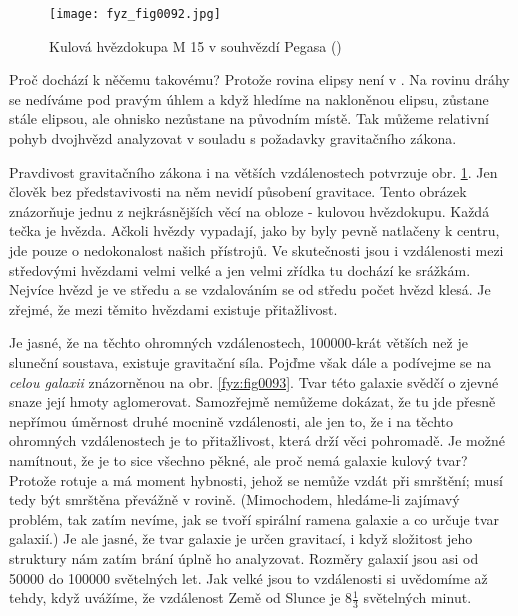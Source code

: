     \begin{figure}[ht!]  %
      \centering
      \texttt{[image: fyz\_fig0092.jpg]}
      \caption{Kulová hvězdokupa M 15 v souhvězdí Pegasa (\cite[s.~100]{Feynman01})}
      \label{fyz:fig0092}
    \end{figure}
    
    Proč dochází k něčemu takovému? Protože rovina elipsy není v . Na rovinu 
    dráhy se nedíváme pod pravým úhlem a když hledíme na nakloněnou elipsu, zůstane stále elipsou, 
    ale ohnisko nezůstane na původním místě. Tak můžeme relativní pohyb dvojhvězd analyzovat v 
    souladu s požadavky gravitačního zákona. 
    
    Pravdivost gravitačního zákona i na větších vzdálenostech potvrzuje obr. \ref{fyz:fig0092}. Jen 
    člověk bez představivosti na něm nevidí působení gravitace. Tento obrázek znázorňuje jednu z 
    nejkrásnějších věcí na obloze - kulovou hvězdokupu. Každá tečka je hvězda. Ačkoli hvězdy 
    vypadají, jako by byly pevně natlačeny k centru, jde pouze o nedokonalost našich přístrojů. Ve 
    skutečnosti jsou i vzdálenosti mezi středovými hvězdami velmi velké a jen velmi zřídka tu 
    dochází ke srážkám. Nejvíce hvězd je ve středu a se vzdalováním se od středu počet hvězd klesá. 
    Je zřejmé, že mezi těmito hvězdami existuje přitažlivost. 
    
    Je jasné, že na těchto ohromných vzdálenostech, \num{100000}-krát větších než je sluneční 
    soustava, existuje gravitační síla. Pojďme však dále a podívejme se na \emph{celou galaxii} 
    znázorněnou na obr. \ref{fyz:fig0093}. Tvar této galaxie svědčí o zjevné snaze její hmoty 
    aglomerovat. Samozřejmě nemůžeme dokázat, že tu jde přesně nepřímou úměrnost druhé mocnině 
    vzdálenosti, ale jen to, že i na těchto ohromných vzdálenostech je to přitažlivost, která drží 
    věci pohromadě. Je možné namítnout, že je to sice všechno pěkné, ale proč nemá galaxie kulový 
    tvar? Protože rotuje a má moment hybnosti, jehož se nemůže vzdát při smrštění; musí tedy být 
    smrštěna převážně v rovině. (Mimochodem, hledáme-li zajímavý problém, tak zatím nevíme, jak se 
    tvoří spirální ramena galaxie a co určuje tvar galaxií.) Je ale jasné, že tvar galaxie je určen 
    gravitací, i když složitost jeho struktury nám zatím brání úplně ho analyzovat. Rozměry galaxií 
    jsou asi od \num{50000} do \num{100000} světelných let. Jak velké jsou to vzdálenosti si 
    uvědomíme až tehdy, když uvážíme, že vzdálenost Země od Slunce je  \(8\tfrac{1}{3}\) světelných 
    minut. 
    
